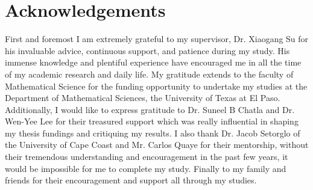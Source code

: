 

\chapter*{Acknowledgements}

First and foremost I am extremely grateful to my supervisor, Dr. Xiaogang Su for his invaluable advice, continuous support, and patience during my study. His immense knowledge and plentiful experience have encouraged me in all the time of my academic research and daily life. My gratitude extends to the faculty of Mathematical Science for the funding opportunity to undertake my studies at the Department of Mathematical Sciences, the University of Texas at El Paso. Additionally, I would like to express gratitude to Dr. Suneel B Chatla and Dr. Wen-Yee Lee for their treasured support which was really influential in shaping my thesis fundings and critiquing my results. I also thank Dr. Jacob Setorglo of the University of Cape Coast and Mr. Carlos Quaye for their mentorship, without their tremendous understanding and encouragement in the past few years, it would be impossible for me to complete my study. Finally to my family and friends for their encouragement and support all through my studies.